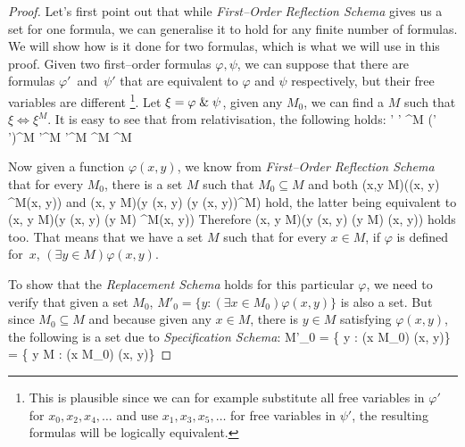 \begin{proof}
Let's first point out that while \emph{First–Order Reflection Schema} gives us a set for one formula, we can generalise it to hold for any finite number of formulas. We will show how is it done for two formulas, which is what we will use in this proof. Given two first–order formulas $\varphi, \psi$, we can suppose that there are formulas $\varphi'$~and~$\psi'$ that are equivalent to $\varphi$ and $\psi$ respectively, but their free variables are different \footnote{This is plausible since we can for example substitute all free variables in $\varphi'$ for $x_0, x_2, x_4, \ldots$ and use $x_1, x_3, x_5, \ldots$ for free variables in $\psi'$, the resulting formulas will be logically equivalent.}. Let $\xi = \varphi \mathrel{\&} \psi$, given any $M_0$, we can find a $M$ such that $\xi \iff \xi^M$. It is easy to see that from relativisation, the following holds:
\beq
\varphi \et \psi \iff \varphi' \et \psi' \iff \xi \iff \xi^M \iff (\varphi' \et \psi')^M \iff \varphi'^M \et \psi'^M \iff \varphi^M \et \psi^M
\eeq

Now given a function $\varphi(x, y)$, we know from \emph{First–Order Reflection Schema} that for every $M_0$, there is a set $M$ such that $M_0 \subseteq M$ and both
\beq
(\forall x,y \in M)(\varphi(x, y) \iff \varphi^M(x, y))
\eeq 
and
\beq
(\forall x, y \in M)(\exists y \varphi(x, y) \iff (\exists y \varphi(x, y))^M)
\eeq 
hold, the latter being equivalent to 
\beq
(\forall x, y \in M)(\exists y \varphi(x, y) \iff (\exists y \in M) \varphi^M(x, y))
\eeq
Therefore 
\beq
(\forall x, y \in M)(\exists y \varphi(x, y) \iff (\exists y \in M) \varphi(x, y))
\eeq
holds too.
That means that we have a set $M$ such that for every $x \in M$, if $\varphi$ is defined for~$x$, $(\exists y \in M) \varphi(x, y)$. 

To show that the \emph{Replacement Schema} holds for this particular $\varphi$, we need to verify that given a set $M_0$, $M'_0 = \{ y : (\exists x \in M_0) \varphi(x, y)\}$ is also a set. But since $M_0 \subseteq M$ and because given any $x \in M$, there is $y \in M$ satisfying $\varphi(x, y)$, the following is a set due to \emph{Specification Schema}:
\beq
M'_0 = \{ y : (\exists x \in M_0) \varphi(x, y)\} = \{ y \in M : (\exists x \in M_0) \varphi(x, y)\}
\eeq

\ece
\end{proof}

